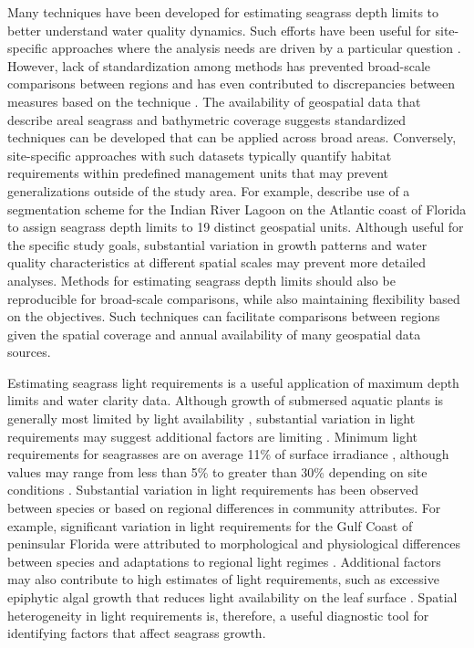 \documentclass[letterpaper,12pt,oneside]{article}\usepackage[]{graphicx}\usepackage[]{color}
\begin{document}
Many techniques have been developed for estimating seagrass depth limits to better understand water quality dynamics.  Such efforts have been useful for site-specific approaches where the analysis needs are driven by a particular question \citep[e.g.,][]{Iverson86,Hale04}. However, lack of standardization among methods has prevented broad-scale comparisons between regions and has even contributed to discrepancies between measures based on the technique \citep{Spears09}.  The availability of geospatial data that describe areal seagrass and bathymetric coverage suggests standardized techniques can be developed that can be applied across broad areas.  Conversely, site-specific approaches with such datasets typically quantify habitat requirements within predefined management units that may prevent generalizations outside of the study area. For example, \cite{Steward05} describe use of a segmentation scheme for the Indian River Lagoon on the Atlantic coast of Florida to assign seagrass depth limits to 19 distinct geospatial units.  Although useful for the specific study goals, substantial variation in growth patterns and water quality characteristics at different spatial scales may prevent more detailed analyses.  Methods for estimating seagrass depth limits should also be reproducible for broad-scale comparisons, while also maintaining flexibility based on the objectives. Such techniques can facilitate comparisons between regions given the spatial coverage and annual availability of many geospatial data sources.  

Estimating seagrass light requirements is a useful application of maximum depth limits and water clarity data.  Although growth of submersed aquatic plants is generally most limited by light availability \citep{Barko82,Hall90,Dennison93}, substantial variation in light requirements may suggest additional factors are limiting \citep{Dennison93,Choice14}.  Minimum light requirements for seagrasses are on average 11\% of surface irradiance \citep{Duarte91}, although values may range from less than 5\% to greater than 30\% depending on site conditions \citep{Dennison93}. Substantial variation in light requirements has been observed between species or based on regional differences in community attributes.  For example, significant variation in light requirements for the Gulf Coast of peninsular Florida were attributed to morphological and physiological differences between species and adaptations to regional light regimes \citep{Choice14}. Additional factors may also contribute to high estimates of light requirements, such as excessive epiphytic algal growth that reduces light availability on the leaf surface \citep{Kemp04}. Spatial heterogeneity in light requirements is, therefore, a useful diagnostic tool for identifying factors that affect seagrass growth. 
\end{document}

